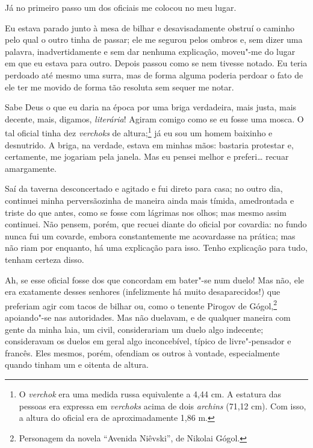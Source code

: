 Já no primeiro passo um dos oficiais me colocou no meu lugar.

Eu estava parado junto à mesa de bilhar e desavisadamente obstruí o
caminho pelo qual o outro tinha de passar; ele me segurou pelos ombros
e, sem dizer uma palavra, inadvertidamente e sem dar nenhuma
explicação, moveu"-me do lugar em que eu estava para outro. Depois
passou como se nem tivesse notado. Eu teria perdoado até mesmo uma
surra, mas de forma alguma poderia perdoar o fato de ele ter me movido
de forma tão resoluta sem sequer me notar.

Sabe Deus o que eu daria na época por uma briga verdadeira, mais justa,
mais decente, mais, digamos, \textit{literária}! Agiram comigo como se
eu fosse uma mosca. O tal oficial tinha dez \textit{verchoks} de
altura;\footnote{ O \textit{verchok} era uma medida russa equivalente a
4,44 cm. A estatura das pessoas era expressa em \textit{verchoks} acima
de dois \textit{archins} (71,12 cm). Com isso, a altura do oficial era
de aproximadamente 1,86 m.} já eu sou um homem baixinho e desnutrido. A
briga, na verdade, estava em minhas mãos: bastaria protestar e,
certamente, me jogariam pela janela. Mas eu pensei melhor e preferi\ldots{}
recuar amargamente.

Saí da taverna desconcertado e agitado e fui direto para casa; no outro
dia, continuei minha perversãozinha de maneira ainda mais tímida,
amedrontada e triste do que antes, como se fosse com lágrimas nos
olhos; mas mesmo assim continuei. Não pensem, porém, que recuei diante
do oficial por covardia: no fundo nunca fui um covarde, embora
constantemente me acovardasse na prática; mas não riam por enquanto, há
uma explicação para isso. Tenho explicação para tudo, tenham certeza
disso.

Ah, se esse oficial fosse dos que concordam em bater"-se num duelo! Mas
não, ele era exatamente desses senhores (infelizmente há muito
desaparecidos!) que preferiam agir com tacos de bilhar ou, como o
tenente Pirogov de Gógol,\footnote{ Personagem da novela “Avenida
Niêvski”, de Nikolai Gógol.} apoiando"-se nas autoridades. Mas não
duelavam, e de qualquer maneira com gente da minha laia, um civil,
considerariam um duelo algo indecente; consideravam os duelos em geral
algo inconcebível, típico de livre"-pensador e francês. Eles mesmos,
porém, ofendiam os outros à vontade, especialmente quando tinham um e
oitenta de altura.

